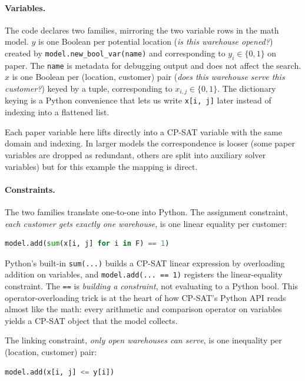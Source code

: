 \paragraph{Variables.} The code declares two families, mirroring the two
variable rows in the math model. \(y\) is one Boolean per potential location (\emph{is
this warehouse opened?}) created by
\lstinline!model.new_bool_var(name)! and corresponding
to \(y_i \in \{0, 1\}\) on paper. The \lstinline!name! is
metadata for debugging output and does not affect the search. \(x\) is
one Boolean per (location, customer) pair (\emph{does this warehouse
serve this customer?}) keyed by a tuple, corresponding to
\(x_{i,j} \in \{0, 1\}\). The dictionary keying is a Python convenience
that lets us write \lstinline!x[i, j]! later instead of
indexing into a flattened list.

Each paper variable here lifts directly into a CP-SAT variable with the
same domain and indexing. In larger models the correspondence is looser
(some paper variables are dropped as redundant, others are split into
auxiliary solver variables) but for this example the mapping is
direct.

\paragraph{Constraints.} The two families translate one-to-one into
Python. The assignment constraint, \emph{each customer gets exactly one
warehouse}, is one linear equality per customer:

\begin{lstlisting}[language=Python]
model.add(sum(x[i, j] for i in F) == 1)
\end{lstlisting}

Python's built-in \lstinline!sum(...)! builds a CP-SAT
linear expression by overloading addition on variables, and
\lstinline!model.add(... == 1)! registers the
linear-equality constraint. The \lstinline!==! is
\emph{building a constraint}, not evaluating to a Python bool. This
operator-overloading trick is at the heart of how CP-SAT's Python API
reads almost like the math: every arithmetic and comparison operator on
variables yields a CP-SAT object that the model collects.

The linking constraint, \emph{only open warehouses can serve}, is one
inequality per (location, customer) pair:

\begin{lstlisting}[language=Python]
model.add(x[i, j] <= y[i])
\end{lstlisting}

